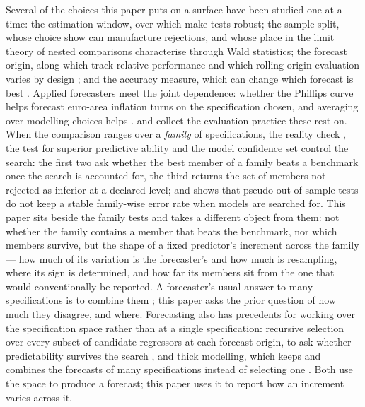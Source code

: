 Several of the choices this paper puts on a surface have been studied one at
a time: the estimation window, over which \citet{rossi2012window} make tests
robust; the sample split, whose choice \citet{hansen2012sample} show can
manufacture rejections, and whose place in the limit theory of nested
comparisons \citet{hansen2015equivalence} characterise through Wald
statistics; the forecast origin, along which \citet{giacomini2010unstable}
track relative performance and which rolling-origin evaluation varies by
design \citep{tashman2000outofsample}; and the accuracy measure, which can
change which forecast is best \citep{hyndman2006another,kolassa2020best}.
Applied forecasters meet the joint dependence: whether the Phillips curve
helps forecast euro-area inflation turns on the specification chosen, and
averaging over modelling choices helps \citep{banbura2023phillips}.
\citet{petropoulos2022forecasting} and \citet{hewamalage2023forecast} collect
the evaluation practice these rest on. When the comparison ranges over a
\emph{family} of specifications, the reality check \citep{white2000reality},
the test for superior predictive ability \citep{hansen2005spa} and the model
confidence set \citep{hansen2011mcs} control the search: the first two ask
whether the best member of a family beats a benchmark once the search is
accounted for, the third returns the set of members not rejected as inferior
at a declared level; and \citet{hunt2022insample} shows that pseudo-out-of-sample
tests do not keep a stable family-wise error rate when models are searched
for. This paper sits beside the family tests and takes a different object
from them: not whether the family contains a member that beats the
benchmark, nor which members survive, but the shape of a fixed predictor's
increment across the family --- how much of its variation is the
forecaster's and how much is resampling, where its sign is determined, and
how far its members sit from the one that would conventionally be reported.
A forecaster's usual answer to many specifications is to combine them
\citep{wang2023combinations}; this paper asks the prior question of how much
they disagree, and where. Forecasting also has precedents for working over the
specification space rather than at a single specification: recursive selection over
every subset of candidate regressors at each forecast origin, to ask whether
predictability survives the search \citep{pesaran1995predictability}, and
thick modelling, which keeps and combines the forecasts of many
specifications instead of selecting one
\citep{granger2004thick,aiolfi2005model}. Both use the space to produce a
forecast; this paper uses it to report how an increment varies across it.


